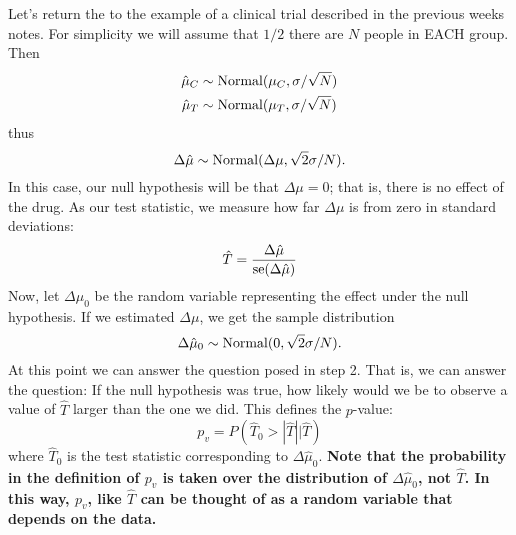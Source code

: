 Let's return the to the example of a clinical trial described in the previous weeks notes.  For simplicity we will assume that $1/2$ there are $N$ people in EACH group. Then 
 \begin{align}
 \hat{\mu}_C &\sim {\rm Normal}(\mu_C,\sigma/\sqrt{N})\\
  \hat{\mu}_T &\sim {\rm Normal}(\mu_T,\sigma/\sqrt{N})
 \end{align}
 thus 
\begin{equation}
\Delta \hat{\mu} \sim {\rm Normal}(\Delta \mu,\sqrt{2}\sigma/N). 
\end{equation}
In this case, our null hypothesis will be that $\Delta \mu = 0$; that is, there is no effect of the drug. As our test statistic, we measure how far $\Delta \mu$ is from zero in standard deviations: 
\begin{equation}
\hat{T} = \frac{\Delta \hat{\mu}}{{\rm se}(\Delta \hat{\mu} )}
\end{equation}
Now, let $\Delta \mu_0$ be the random variable representing the effect under the null hypothesis. If we estimated $\Delta \mu$, we get the sample distribution 
\begin{equation}
\Delta \hat{\mu}_0 \sim {\rm Normal}(0,\sqrt{2}\sigma/N).
\end{equation}
At this point we can answer the question posed in step 2. That is, we can answer the question: If the null hypothesis was true, how likely would we be to observe a value of $\hat{T}$ larger than the one we did.  This defines the $p$-value:
\begin{equation}
p_v = P(\hat{T}_0>|\hat{T}||\hat{T})
\end{equation}
where $\hat{T}_0$ is the test statistic corresponding to $\Delta \hat{\mu}_0$. {\bf Note that the probability in the definition of $p_v$ is taken over the distribution of $\Delta \hat{\mu}_0$, not $\hat{T}$. In this way, $p_v$, like $\hat{T}$ can be thought of as a random variable that depends on the data.}
%


